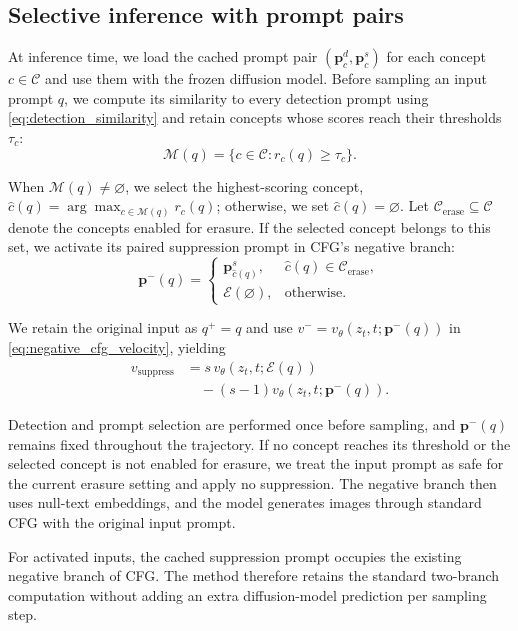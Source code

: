 \subsection{Selective inference with prompt pairs}
\label{sec:inference}

At inference time, we load the cached prompt pair $(\mathbf p_c^d,\mathbf p_c^s)$ for each concept $c\in\mathcal C$ and use them with the frozen diffusion model.
Before sampling an input prompt $q$, we compute its similarity to every detection prompt using \cref{eq:detection_similarity} and retain concepts whose scores reach their thresholds $\tau_c$:
\begin{equation}
    \mathcal M(q)=\{c\in\mathcal C:r_c(q)\ge\tau_c\}.
    \label{eq:inference_matches}
\end{equation}

When $\mathcal M(q)\ne\varnothing$, we select the highest-scoring concept, $\hat c(q)=\arg\max_{c\in\mathcal M(q)}r_c(q)$; otherwise, we set $\hat c(q)=\varnothing$.
Let $\mathcal C_{\mathrm{erase}}\subseteq\mathcal C$ denote the concepts enabled for erasure.
If the selected concept belongs to this set, we activate its paired suppression prompt in CFG's negative branch:
\begin{equation}
    \mathbf p^-(q)=
    \begin{cases}
        \mathbf p_{\hat c(q)}^s,
        &\hat c(q)\in\mathcal C_{\mathrm{erase}},\\[4pt]
        \mathcal E(\varnothing),
        &\text{otherwise}.
    \end{cases}
    \label{eq:inference_negative_embeddings}
\end{equation}

We retain the original input as $q^+=q$ and use $v^-=v_\theta(z_t,t;\mathbf p^-(q))$ in \cref{eq:negative_cfg_velocity}, yielding
\begin{equation}
    \begin{aligned}
        v_{\mathrm{suppress}} &= s\,v_\theta(z_t,t;\mathcal E(q))\\
        &\quad -(s-1)v_\theta(z_t,t;\mathbf p^-(q)).
    \end{aligned}
    \label{eq:inference_guided_velocity}
\end{equation}

Detection and prompt selection are performed once before sampling, and $\mathbf p^-(q)$ remains fixed throughout the trajectory.
If no concept reaches its threshold or the selected concept is not enabled for erasure, we treat the input prompt as safe for the current erasure setting and apply no suppression.
The negative branch then uses null-text embeddings, and the model generates images through standard CFG with the original input prompt.


For activated inputs, the cached suppression prompt occupies the existing negative branch of CFG. 
The method therefore retains the standard two-branch computation without adding an extra diffusion-model prediction per sampling step. 

